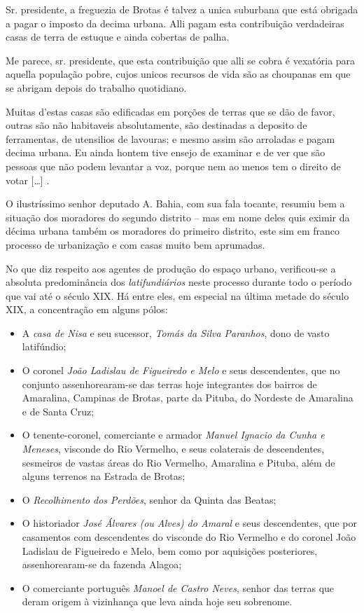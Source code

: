 \begin{citacao}
Sr. presidente, a freguezia de Brotas é talvez a unica suburbana que está obrigada a pagar o imposto da decima urbana. Alli pagam esta contribuição verdadeiras casas de terra de estuque e ainda cobertas de palha.

Me parece, sr. presidente, que esta contribuição que alli se cobra é vexatória para aquella população pobre, cujos unicos recursos de vida são as choupanas em que se abrigam depois do trabalho quotidiano.

Muitas d'estas casas são edificadas em porções de terras que se dão de favor, outras são não habitaveis absolutamente, são destinadas a deposito de ferramentas, de utensilios de lavouras; e mesmo assim são arroladas e pagam decima urbana. Eu ainda hontem tive ensejo de examinar e de ver que são pessoas que não podem levantar a voz, porque nem ao menos tem o direito de votar [\dots] \cite[p.~335]{bahia_assembleia_1887}.
\end{citacao}

O ilustríssimo senhor deputado A. Bahia, com sua fala tocante, resumiu bem a situação dos moradores do segundo distrito -- mas em nome deles quis eximir da décima urbana também os moradores do primeiro distrito, este sim em franco processo de urbanização e com casas muito bem aprumadas.

No que diz respeito aos agentes de produção do espaço urbano, verificou-se a absoluta predominância dos \textit{latifundiários} neste processo durante todo o período que vai até o século XIX. Há entre eles, em especial na última metade do século XIX, a concentração em alguns pólos: 

\begin{itemize}
\item A \textit{casa de Nisa} e seu sucessor, \textit{Tomás da Silva Paranhos}, dono de vasto latifúndio;
\item O coronel \textit{João Ladislau de Figueiredo e Melo} e seus descendentes, que no conjunto assenhorearam-se das terras hoje integrantes dos bairros de Amaralina, Campinas de Brotas, parte da Pituba, do Nordeste de Amaralina e de Santa Cruz; 
\item O tenente-coronel, comerciante e armador \textit{Manuel Ignacio da Cunha e Meneses}, visconde do Rio Vermelho, e seus colaterais de descendentes, sesmeiros de vastas áreas do Rio Vermelho, Amaralina e Pituba, além de alguns terrenos na Estrada de Brotas;
\item O \textit{Recolhimento dos Perdões}, senhor da Quinta das Beatas;
\item O historiador \textit{José Álvares (ou Alves) do Amaral} e seus descendentes, que por casamentos com descendentes do visconde do Rio Vermelho e do coronel João Ladislau de Figueiredo e Melo, bem como por aquisições posteriores, assenhorearam-se da fazenda Alagoa;
\item O comerciante português \textit{Manoel de Castro Neves}, senhor das terras que deram origem à vizinhança que leva ainda hoje seu sobrenome.
\end{itemize}

